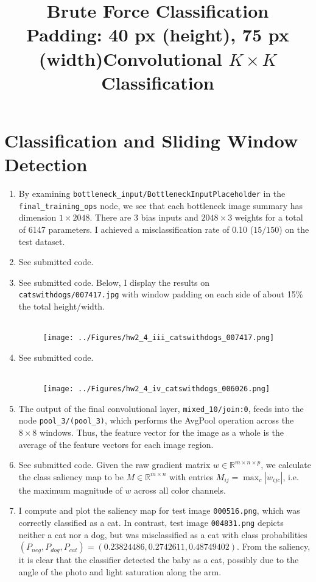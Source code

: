 \documentclass[12pt]{article}
\begin{document}
\section{Classification and Sliding Window Detection}
\begin{enumerate}
	\item By examining \verb|bottleneck_input/BottleneckInputPlaceholder| in the \verb|final_training_ops| node, we see that each bottleneck image summary has dimension $1 \times 2048$. There are 3 bias inputs and $2048 \times 3$ weights for a total of 6147 parameters. I achieved a misclassification rate of 0.10 ($15 / 150$) on the test dataset.
	\item See submitted code.
	\item See submitted code. Below, I display the results on \verb|catswithdogs/007417.jpg| with window padding on each side of about 15\% the total height/width.
	\begin{figure}[H]
		\centering
		\title{\bf Brute Force Classification \\
			Padding: 40 px (height), 75 px (width)}
		\\ \vspace{5mm}
		\texttt{[image: ../Figures/hw2\_4\_iii\_catswithdogs\_007417.png]}
	\end{figure}
	\item See submitted code.
	\begin{figure}[H]
		\centering
		\title{\bf Convolutional $K \times K$ Classification}
		\\ \vspace{5mm}
		\texttt{[image: ../Figures/hw2\_4\_iv\_catswithdogs\_006026.png]}
	\end{figure}
	\item The output of the final convolutional layer, \verb|mixed_10/join:0|, feeds into the node \verb|pool_3/(pool_3)|, which performs the AvgPool operation across the $8 \times 8$ windows. Thus, the feature vector for the image as a whole is the average of the feature vectors for each image region.
	\item See submitted code. Given the raw gradient matrix $w \in \mathbb{R}^{m \times n \times p}$, we calculate the class saliency map to be $M \in \mathbb{R}^{m \times n}$ with entries $M_{ij} = \max_c |w_{ijc}|$, i.e. the maximum magnitude of $w$ across all color channels.
	\item I compute and plot the saliency map for test image \verb|000516.png|, which was correctly classified as a cat. In contrast, test image \verb|004831.png| depicts neither a cat nor a dog, but was misclassified as a cat with class probabilities $(P_{neg}, P_{dog}, P_{cat}) = (0.23824486, 0.2742611, 0.48749402)$. From the saliency, it is clear that the classifier detected the baby as a cat, possibly due to the angle of the photo and light saturation along the arm.

\end{enumerate}
\end{document}
